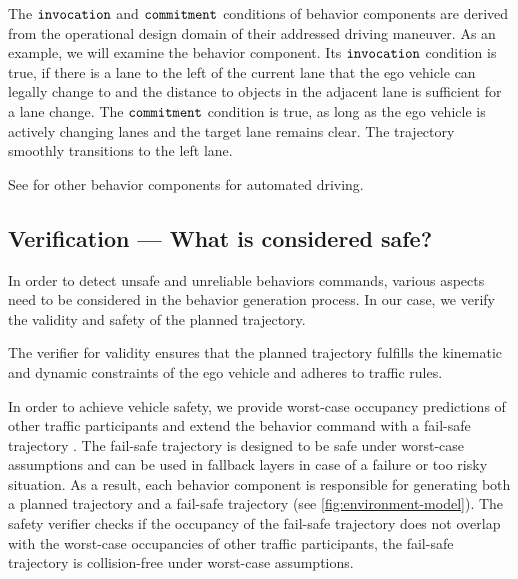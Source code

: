 The $\texttt{invocation}$ and $\texttt{commitment}$ conditions of behavior components are derived from the operational design domain of their addressed driving maneuver.
%
As an example, we will examine the  behavior component.
Its $\texttt{invocation}$ condition is true,
if there is a lane to the left of the current lane that the ego vehicle can legally change to and the distance to objects in the adjacent lane is sufficient for a lane change.
The $\texttt{commitment}$ condition is true, as long as the ego vehicle is actively changing lanes
and the target lane remains clear.
The trajectory smoothly transitions to the left lane.

See \cite{orzechowskiVerhaltensentscheidungFuerAutomatisierte2023} for other behavior components for automated driving.






\subsection{Verification --- What is considered \textbf{safe}?}

In order to detect unsafe and unreliable behaviors commands,
various aspects need to be considered in the behavior generation process.
%
In our case, we verify the validity and safety of the planned trajectory.

The verifier for validity ensures that the planned trajectory fulfills the kinematic and dynamic constraints of the ego vehicle
and adheres to traffic rules.

In order to achieve vehicle safety, we
provide worst-case occupancy predictions of other traffic participants
and extend the behavior command with a fail-safe trajectory \cite{althoffSetBasedPredictionTraffic2016}.
The fail-safe trajectory is designed to be safe under worst-case assumptions
and can be used in fallback layers in case of a failure or too risky situation.
As a result, each behavior component is responsible for generating both
a planned trajectory and a fail-safe trajectory (see \cref{fig:environment-model}).
The safety verifier checks if the occupancy of the fail-safe trajectory does not overlap
with the worst-case occupancies of other traffic participants,
\ie the fail-safe trajectory is collision-free under worst-case assumptions.



